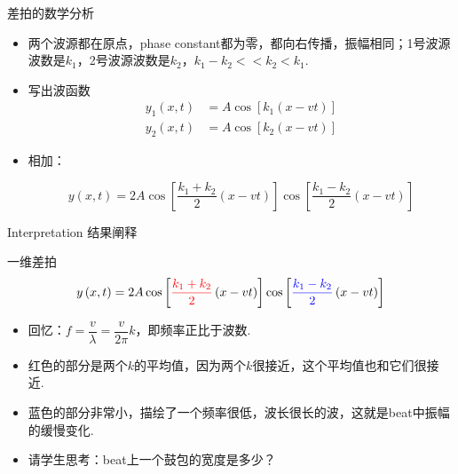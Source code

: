 \documentclass{beamer}
\newcommand{\stuname}{学生}
\begin{document}
\begin{frame}{差拍的数学分析}
	\begin{itemize}
		\item 两个波源都在原点，phase constant都为零，都向右传播，振幅相同；1号波源波数是$k_1$，2号波源波数是$k_2$，$k_1-k_2<<k_2<k_1$.
		\item 写出波函数
		\begin{align*}
			y_1\left(x, t\right) &= A \cos \left[k_1\left(x - vt\right)\right]\\
			y_2\left(x, t\right) &= A \cos \left[k_2\left(x - vt\right)\right]
		\end{align*}
		\item 相加：
		
		\[y\left(x, t\right) = 2A\cos\left[\frac{k_1 + k_2}{2}\left(x - vt\right)\right]\cos\left[\frac{k_1 - k_2}{2}\left(x - vt\right)\right]\]
	\end{itemize}
\end{frame}

\begin{frame}{Interpretation 结果阐释}
	\begin{block}{一维差拍}
		\[y\left(x, t\right) = 2A\cos\left[\textcolor{red}{\frac{k_1 + k_2}{2}}\left(x - vt\right)\right]\cos\left[\textcolor{blue}{\frac{k_1 - k_2}{2}}\left(x - vt\right)\right]\]
	\end{block}
	\begin{itemize}
		\item 回忆：$f = \dfrac{v}{\lambda} = \dfrac{v}{2\pi} k$，即频率正比于波数.
		\item 红色的部分是两个$k$的平均值，因为两个$k$很接近，这个平均值也和它们很接近.
		\item 蓝色的部分非常小，描绘了一个频率很低，波长很长的波，这就是beat中振幅的缓慢变化.
		\item 请\stuname 思考：beat上一个鼓包的宽度是多少？
	\end{itemize}
\end{frame}
\end{document}
